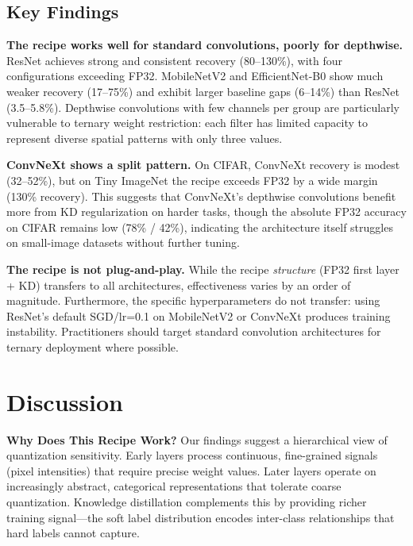 \documentclass[10pt]{article}
\begin{document}
\subsection{Key Findings}

\textbf{The recipe works well for standard convolutions, poorly for depthwise.} ResNet achieves strong and consistent recovery (80--130\%), with four configurations exceeding FP32. MobileNetV2 and EfficientNet-B0 show much weaker recovery (17--75\%) and exhibit larger baseline gaps (6--14\%) than ResNet (3.5--5.8\%). Depthwise convolutions with few channels per group are particularly vulnerable to ternary weight restriction: each filter has limited capacity to represent diverse spatial patterns with only three values.

\textbf{ConvNeXt shows a split pattern.} On CIFAR, ConvNeXt recovery is modest (32--52\%), but on Tiny ImageNet the recipe exceeds FP32 by a wide margin (130\% recovery). This suggests that ConvNeXt's depthwise convolutions benefit more from KD regularization on harder tasks, though the absolute FP32 accuracy on CIFAR remains low (78\% / 42\%), indicating the architecture itself struggles on small-image datasets without further tuning.

\textbf{The recipe is not plug-and-play.} While the recipe \emph{structure} (FP32 first layer + KD) transfers to all architectures, effectiveness varies by an order of magnitude. Furthermore, the specific hyperparameters do not transfer: using ResNet's default SGD/lr=0.1 on MobileNetV2 or ConvNeXt produces training instability. Practitioners should target standard convolution architectures for ternary deployment where possible.


\section{Discussion}
\label{sec:discussion}

\textbf{Why Does This Recipe Work?}
Our findings suggest a hierarchical view of quantization sensitivity. Early layers process continuous, fine-grained signals (pixel intensities) that require precise weight values. Later layers operate on increasingly abstract, categorical representations that tolerate coarse quantization. Knowledge distillation complements this by providing richer training signal---the soft label distribution encodes inter-class relationships that hard labels cannot capture.
\end{document}
